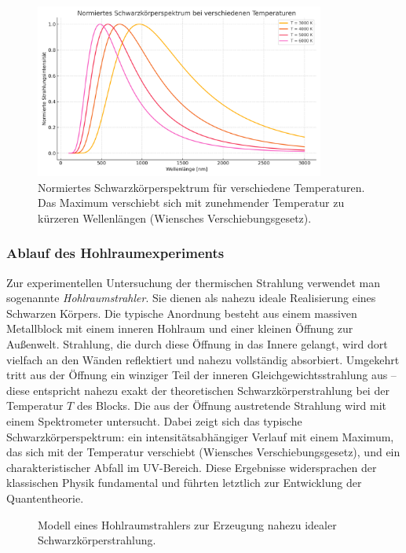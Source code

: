 \begin{figure}[H]
	\centering
	\includegraphics[width=0.85\textwidth]{bilder/schwarzer_koerper_spektrum.png}
	\caption{Normiertes Schwarzkörperspektrum für verschiedene Temperaturen. Das Maximum verschiebt sich mit zunehmender Temperatur zu kürzeren Wellenlängen (Wiensches Verschiebungsgesetz).}
	\label{fig:schwarzerkoerper}
\end{figure}

\subsubsection{Ablauf des Hohlraumexperiments}

Zur experimentellen Untersuchung der thermischen Strahlung verwendet man sogenannte \emph{Hohlraumstrahler}. Sie dienen als nahezu ideale Realisierung eines Schwarzen Körpers. Die typische Anordnung besteht aus einem massiven Metallblock mit einem inneren Hohlraum und einer kleinen Öffnung zur Außenwelt.
Strahlung, die durch diese Öffnung in das Innere gelangt, wird dort vielfach an den Wänden reflektiert und nahezu vollständig absorbiert. Umgekehrt tritt aus der Öffnung ein winziger Teil der inneren Gleichgewichtsstrahlung aus – diese entspricht nahezu exakt der theoretischen Schwarzkörperstrahlung bei der Temperatur \( T \) des Blocks.
Die aus der Öffnung austretende Strahlung wird mit einem Spektrometer untersucht. Dabei zeigt sich das typische Schwarzkörperspektrum: ein intensitätsabhängiger Verlauf mit einem Maximum, das sich mit der Temperatur verschiebt (Wiensches Verschiebungsgesetz), und ein charakteristischer Abfall im UV-Bereich. Diese Ergebnisse widersprachen der klassischen Physik fundamental und führten letztlich zur Entwicklung der Quantentheorie.

\begin{figure}[H]
	\centering
	\caption{Modell eines Hohlraumstrahlers zur Erzeugung nahezu idealer Schwarzkörperstrahlung.}
\end{figure}
\newpage
\noindent
